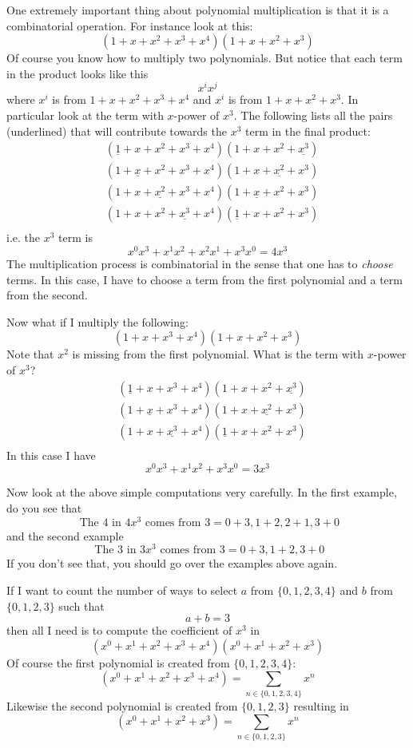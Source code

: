 One extremely important thing about polynomial multiplication
is that it is a combinatorial operation.
For instance look at this:
\[
(1 + x + x^2 + x^3 + x^4)
(1 + x + x^2 + x^3)
\]
Of course you know how to multiply two polynomials.
But notice that each term in the product looks like this
\[
x^i x^j
\]
where $x^i$ is from $1 + x + x^2 + x^3 + x^4$ and 
$x^i$ is from $1 + x + x^2 + x^3$.
In particular look at the term with $x$-power of $x^3$.
The following lists all the pairs (underlined) that will contribute
towards the $x^3$ term in the final product:
\begin{align*}
&(\underline{1} + x + x^2 + x^3 + x^4)(1 + x + x^2 + \underline{x^3}) \\
&(1 + \underline{x} + x^2 + x^3 + x^4)(1 + x + \underline{x^2} + x^3) \\
&(1 + x + \underline{x^2} + x^3 + x^4)(1 + \underline{x} + x^2 + x^3) \\
&(1 + x + x^2 + \underline{x^3} + x^4)(\underline{1} + x + x^2 + x^3) \\
\end{align*}
i.e. the $x^3$ term is
\[
x^0x^3 + x^1x^2 + x^2x^1 + x^3x^0 = 4x^3
\]
The multiplication process is combinatorial in the sense that
one has to \textit{choose} terms.
In this case,
I have to choose a term from the first polynomial and
a term from the second.

Now what if I multiply the following:
\[
(1 + x + x^3 + x^4)
(1 + x + x^2 + x^3)
\]
Note that $x^2$ is missing from the first polynomial.
What is the term with $x$-power of $x^3$?
\begin{align*}
&(\underline{1} + x + x^3 + x^4)(1 + x + x^2 + \underline{x^3}) \\
&(1 + \underline{x} + x^3 + x^4)(1 + x + \underline{x^2} + x^3) \\
&(1 + x + \underline{x^3} + x^4)(\underline{1} + x + x^2 + x^3) \\
\end{align*}
In this case I have
\[
x^0x^3 + x^1x^2 + x^3x^0 = 3x^3
\]

Now look at the above simple computations very carefully.
In the first example, do you see that
\[
\text{ The 4 in 4$x^3$ comes from } 3 = 0+3, 1+2, 2+1, 3+0
\]
and the second example
\[
\text{ The 3 in $3x^3$ comes from } 3 = 0+3, 1+2, 3+0
\]
If you don't see that, you should go over the examples above again.

If I want to count the number of ways to select $a$ from $\{0, 1, 2, 3, 4\}$
and $b$ from $\{0, 1, 2, 3\}$ such that
\[
a + b = 3
\]
then all I need is to compute the coefficient of $x^3$ in 
\[
(x^0 + x^1 + x^2 + x^3 + x^4)
(x^0 + x^1 + x^2 + x^3)
\]
Of course the first polynomial is created from $\{0,1,2,3,4\}$:
\[
(x^0 + x^1 + x^2 + x^3 + x^4) = \sum_{n \in \{0, 1, 2, 3, 4\}} x^n
\]
Likewise the second polynomial is created from $\{0, 1, 2, 3\}$
resulting in 
\[
(x^0 + x^1 + x^2 + x^3) = \sum_{n \in \{0, 1, 2, 3\}} x^n
\]

